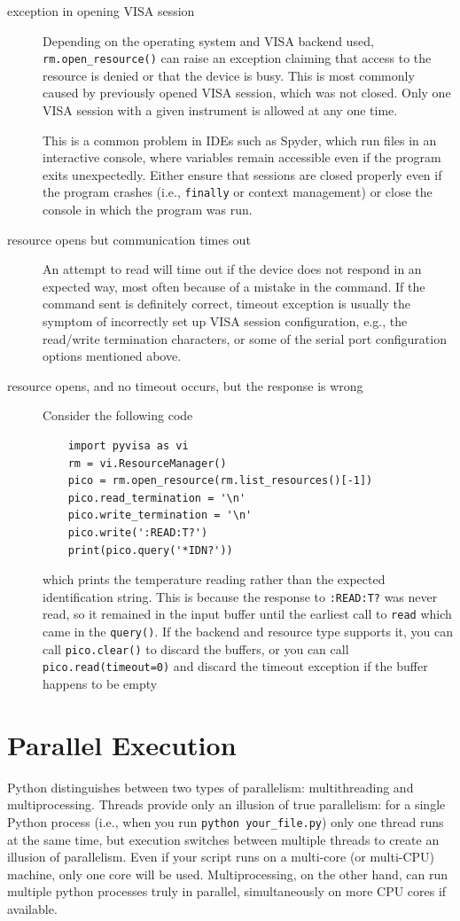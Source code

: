 \documentclass{article}
\newcommand{\ls}[1]{\lstinline{#1}}
\begin{document}
\begin{description}
    \item[exception in opening VISA session] Depending on the operating system and VISA backend used, \ls{rm.open_resource()} can raise an exception claiming that access to the resource is denied or that the device is busy. This is most commonly caused by previously opened VISA session, which was not closed. Only one VISA session with a given instrument is allowed at any one time.
    
    This is a common problem in IDEs such as Spyder, which run files in an interactive console, where variables remain accessible even if the program exits unexpectedly. Either ensure that sessions are closed properly even if the program crashes (i.e., \ls{finally} or context management) or close the console in which the program was run.

    \item[resource opens but communication times out] An attempt to read will time out if the device does not respond in an expected way, most often because of a mistake in the command. If the command sent is definitely correct, timeout exception is usually the symptom of incorrectly set up VISA session configuration, e.g., the read/write termination characters, or some of the serial port configuration options mentioned above.
    
    \item[resource opens, and no timeout occurs, but the response is wrong] Consider the following code
\begin{lstlisting}
    import pyvisa as vi
    rm = vi.ResourceManager()
    pico = rm.open_resource(rm.list_resources()[-1])    
    pico.read_termination = '\n'
    pico.write_termination = '\n'
    pico.write(':READ:T?')
    print(pico.query('*IDN?'))
\end{lstlisting}
    which prints the temperature reading rather than the expected identification string. This is because the response to \verb|:READ:T?| was never read, so it remained in the input buffer until the earliest call to \ls{read} which came in the \ls{query()}. If the backend and resource type supports it, you can call \ls{pico.clear()} to discard the buffers, or you can call \ls{pico.read(timeout=0)} and discard the timeout exception if the buffer happens to be empty
\end{description}

\newpage
\section{Parallel Execution}
Python distinguishes between two types of parallelism: multithreading and multiprocessing. Threads provide only an illusion of true parallelism: for a single Python process (i.e., when you run \ls{python your_file.py}) only one thread runs at the same time, but execution switches between multiple threads to create an illusion of parallelism. Even if your script runs on a multi-core (or multi-CPU) machine, only one core will be used. Multiprocessing, on the other hand, can run multiple python processes truly in parallel, simultaneously on more CPU cores if available.
\end{document}

